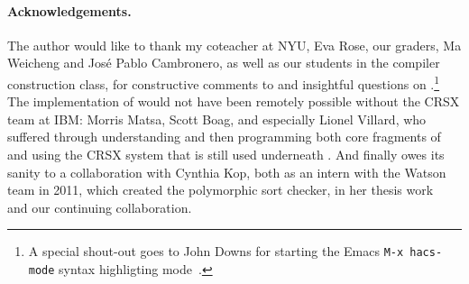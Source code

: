 \documentclass[letterpaper]{article}
\begin{document}
\paragraph*{Acknowledgements.} The author would like to thank my coteacher at NYU, Eva Rose, our
graders, Ma Weicheng and José Pablo Cambronero, as well as our students in the compiler construction
class, for constructive comments to and insightful questions on \HAX.\footnote{A special shout-out
  goes to John Downs for starting the Emacs \texttt{M-x hacs-mode} syntax highligting
  mode~\cite{git:hacsel}.}
The implementation of \HAX would not have been remotely possible without the CRSX team at IBM:
Morris Matsa, Scott Boag, and especially Lionel Villard, who suffered through understanding and then
programming both core fragments of and using the CRSX system that is still used underneath \HAX.
And finally \HAX owes its sanity to a collaboration with Cynthia Kop, both as an intern with the
Watson team in 2011, which created the polymorphic sort checker, in her thesis work~\cite{Kop:2012}
and our continuing collaboration.




\end{document}
